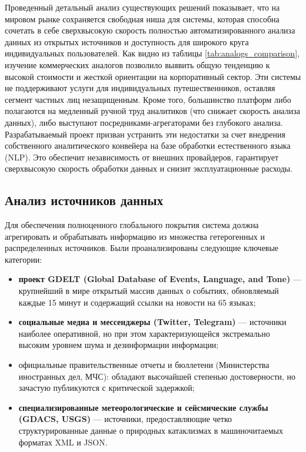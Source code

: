 Проведенный детальный анализ существующих решений показывает, что на мировом рынке сохраняется свободная ниша для системы, которая способна сочетать в себе сверхвысокую скорость полностью автоматизированного анализа данных из открытых источников и доступность для широкого круга индивидуальных пользователей. 
Как видно из таблицы \ref{tab:analogs_comparison}, изучение коммерческих аналогов позволило выявить общую тенденцию к высокой стоимости и жесткой ориентации на корпоративный сектор. Эти системы не поддерживают услуги для индивидуальных путешественников, оставляя сегмент частных лиц незащищенным. Кроме того, большинство платформ либо полагаются на медленный ручной труд аналитиков (что снижает скорость анализа данных), либо выступают посредниками-агрегаторами без глубокого анализа. Разрабатываемый проект призван устранить эти недостатки за счет внедрения собственного аналитического конвейера на базе обработки естественного языка (NLP). Это обеспечит независимость от внешних провайдеров, гарантирует сверхвысокую скорость обработки данных и снизит эксплуатационные расходы.

\subsection{Анализ источников данных}

Для обеспечения полноценного глобального покрытия система должна агрегировать и обрабатывать информацию из множества гетерогенных и распределенных источников. Были проанализированы следующие ключевые категории:

\begin{itemize}
\item \textbf{проект GDELT (Global Database of Events, Language, and Tone)}\cite{gdelt_bib} --- крупнейший в мире открытый массив данных о событиях, обновляемый каждые 15 минут и содержащий ссылки на новости на 65 языках;
\item \textbf{социальные медиа и мессенджеры (Twitter, Telegram)} --- источники наиболее оперативной, но при этом характеризующейся экстремально высоким уровнем шума и дезинформации информации;
\item официальные правительственные отчеты и бюллетени (Министерства иностранных дел, МЧС): обладают высочайшей степенью достоверности, но зачастую публикуются с критической задержкой;
\item \textbf{специализированные метеорологические и сейсмические службы (GDACS, USGS)} --- источники, предоставляющие четко структурированные данные о природных катаклизмах в машиночитаемых форматах XML и JSON.
\end{itemize}

